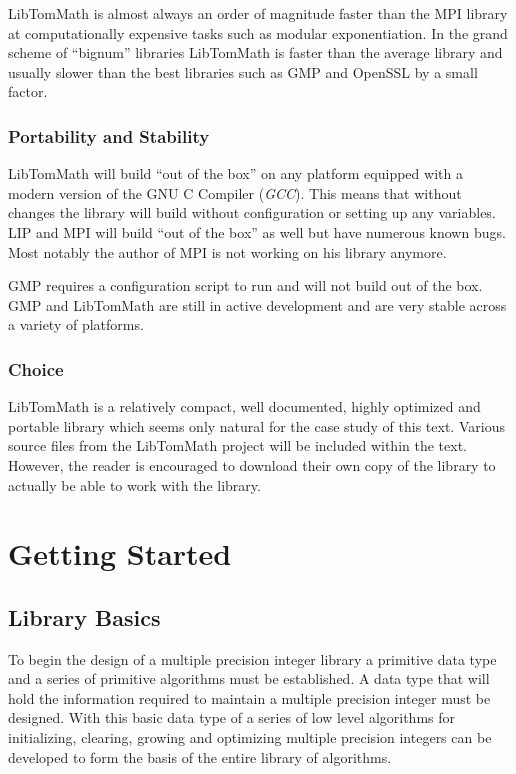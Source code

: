 \documentclass[b5paper]{book}
\begin{document}
LibTomMath is almost always an order of magnitude faster than the MPI library at computationally expensive tasks such as modular
exponentiation.  In the grand scheme of ``bignum'' libraries LibTomMath is faster than the average library and usually  
slower than the best libraries such as GMP and OpenSSL by a small factor.

\subsection{Portability and Stability}
LibTomMath will build ``out of the box'' on any platform equipped with a modern version of the GNU C Compiler 
(\textit{GCC}).  This means that without changes the library will build without configuration or setting up any 
variables.  LIP and MPI will build ``out of the box'' as well but have numerous known bugs.  Most notably the author of 
MPI is not working on his library anymore.  

GMP requires a configuration script to run and will not build out of the box.   GMP and LibTomMath are still in active
development and are very stable across a variety of platforms.

\subsection{Choice}
LibTomMath is a relatively compact, well documented, highly optimized and portable library which seems only natural for
the case study of this text.  Various source files from the LibTomMath project will be included within the text.  However, the 
reader is encouraged to download their own copy of the library to actually be able to work with the library.  

\chapter{Getting Started}
\section{Library Basics}
To begin the design of a multiple precision integer library a primitive data type and a series of primitive algorithms must be established.  A data
type that will hold the information required to maintain a multiple precision integer must be designed.  With this basic data type of a series
of low level algorithms for initializing, clearing, growing and optimizing multiple precision integers can be developed to form the basis of 
the entire library of algorithms.
\end{document}
